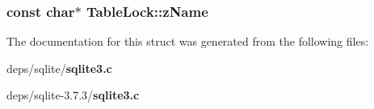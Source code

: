 \subsubsection{\setlength{\rightskip}{0pt plus 5cm}const char$\ast$ \bf{Table\-Lock::z\-Name}}\label{structTableLock_87e67bf1089520306a15985a72d34ff2}




The documentation for this struct was generated from the following files:\begin{CompactItemize}
\item 
deps/sqlite/\bf{sqlite3.c}\item 
deps/sqlite-3.7.3/\bf{sqlite3.c}\end{CompactItemize}
